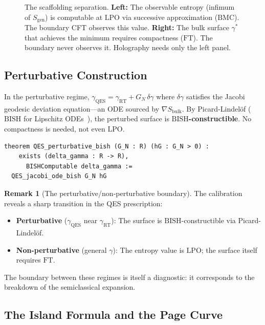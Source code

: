 \documentclass[11pt,a4paper]{article}
\theoremstyle{plain}
\theoremstyle{definition}
\newtheorem{remark}[theorem]{Remark}
\newcommand{\LPO}{\ensuremath{\mathrm{LPO}}}
\newcommand{\BISH}{\ensuremath{\mathrm{BISH}}}
\newcommand{\BMC}{\ensuremath{\mathrm{BMC}}}
\newcommand{\FT}{\ensuremath{\mathrm{FT}}}
\newcommand{\RT}{\ensuremath{\mathrm{RT}}}
\newcommand{\QES}{\ensuremath{\mathrm{QES}}}
\newcommand{\GN}{\ensuremath{G_N}}
\begin{document}
\begin{figure}[ht]
\caption{The scaffolding separation.
\textbf{Left:} The observable entropy (infimum of $S_{\mathrm{gen}}$)
is computable at $\LPO$ via successive approximation ($\BMC$).
The boundary CFT observes this value.
\textbf{Right:} The bulk surface $\gamma^*$ that achieves the
minimum requires compactness ($\FT$).  The boundary never observes
it.  Holography needs only the left panel.}
\label{fig:scaffold}
\end{figure}

\subsection{Perturbative Construction}

In the perturbative regime, $\gamma_{\QES} = \gamma_{\RT} + \GN\,\delta\gamma$
where $\delta\gamma$ satisfies the Jacobi geodesic deviation equation---an
ODE sourced by $\nabla S_{\mathrm{bulk}}$.  By Picard-Lindel\"of ($\BISH$
for Lipschitz ODEs~\cite{Bishop1967}), the perturbed surface is
\textbf{$\BISH$-constructible}.  No compactness is needed, not even $\LPO$.

\begin{lstlisting}[caption={Perturbative QES: \texttt{QESScaffolding.lean}}]
theorem QES_perturbative_bish (G_N : R) (hG : G_N > 0) :
    exists (delta_gamma : R -> R),
      BISHComputable delta_gamma :=
  QES_jacobi_ode_bish G_N hG
\end{lstlisting}

\begin{remark}[The perturbative/non-perturbative boundary]
The calibration reveals a sharp transition in the QES prescription:
\begin{itemize}[nosep]
\item \textbf{Perturbative} ($\gamma_{\QES}$ near $\gamma_{\RT}$):
  The surface is $\BISH$-constructible via Picard-Lindel\"of.
\item \textbf{Non-perturbative} (general $\gamma$): The entropy
  value is $\LPO$; the surface itself requires $\FT$.
\end{itemize}
The boundary between these regimes is itself a diagnostic: it
corresponds to the breakdown of the semiclassical expansion.
\end{remark}

\subsection{The Island Formula and the Page Curve}
\end{document}
